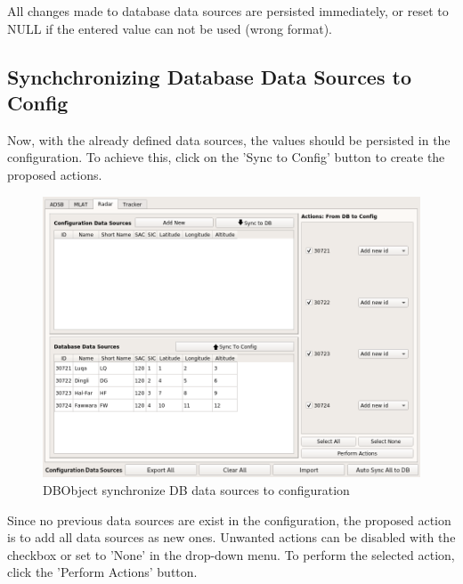 All changes made to database data sources are persisted immediately, or reset to NULL if the entered value can not be used (wrong format).

\subsection{Synchchronizing Database Data Sources to Config}

Now, with the already defined data sources, the values should be persisted in the configuration. To achieve this, click on the 'Sync to Config' button to create the proposed actions.

\begin{figure}[H]
  \center
    \includegraphics[width=16cm,frame]{figures/manage_data_sources_edit_ds_sync2cfg.png}
  \caption{DBObject synchronize DB data sources to configuration }
\end{figure}

Since no previous data sources are exist in the configuration, the proposed action is to add all data sources as new ones. Unwanted actions can be disabled with the checkbox or set to 'None' in the drop-down menu. To perform the selected action, click the 'Perform Actions' button.

